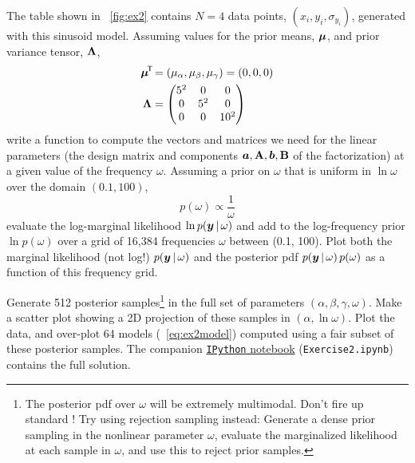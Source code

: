 The table shown in \figurename~\ref{fig:ex2} contains $N=4$ data points,
$(x_i, y_i, \sigma_{y_i})$, generated with this sinusoid model.
Assuming values for the prior means, $\boldsymbol{\mu}$, and prior variance tensor,
$\mathbf{\Lambda}$,
\begin{align}
  \boldsymbol{\mu}^{\!\mathsf{T}\!} &= (\mu_\alpha, \mu_\beta, \mu_\gamma) = (0, 0, 0)\\
  \mathbf{\Lambda} &=
    \begin{pmatrix}
      5^2 & 0 & 0\\
      0 & 5^2 & 0\\
      0 & 0 & 10^2
    \end{pmatrix}
\end{align}
write a function to compute the vectors and matrices we need for the linear
parameters (the design matrix and components
$\boldsymbol{a}, \mathbf{A}, \boldsymbol{b}, \mathbf{B}$
of the factorization) at a given value of the frequency $\omega$.
Assuming a prior on $\omega$ that is uniform in $\ln\omega$ over the domain
$(0.1, 100)$,
\begin{equation}
  p(\omega) \propto \frac{1}{\omega}
\end{equation}
evaluate the log-marginal likelihood $\ln p(\boldsymbol{y}\,|\,\omega)$ and add to the
log-frequency prior $\ln p(\omega)$ over a grid of 16,384 frequencies $\omega$
between (0.1, 100).
Plot both the marginal likelihood (not log!) $p(\boldsymbol{y}\,|\,\omega)$ and the
posterior pdf $p(\boldsymbol{y}\,|\,\omega)\,p(\omega)$ as a function of this frequency
grid.

Generate 512 posterior samples\footnote{The
posterior pdf over $\omega$ will be extremely multimodal. Don't fire up
standard ! Try using rejection sampling instead: Generate a
dense prior sampling in the nonlinear parameter $\omega$, evaluate
the marginalized likelihood at each sample in $\omega$, and use this
to reject prior samples.} in the full set of parameters
$(\alpha,\beta,\gamma,\omega)$.
Make a scatter plot showing a 2D projection of these samples in
$(\alpha, \ln \omega)$.
Plot the data, and over-plot 64 models (\equationname~\ref{eq:ex2model}) computed
using a fair subset of these posterior samples.
The companion \href{https://doi.org/10.5281/zenodo.3855689}{\texttt{IPython}
notebook} (\texttt{Exercise2.ipynb}) contains the full solution.

\clearpage\raggedright



